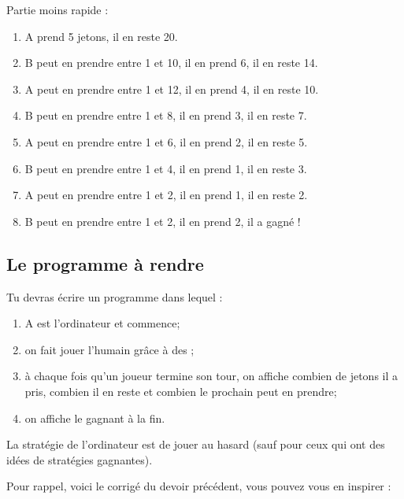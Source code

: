 \documentclass[a4paper,12pt,french]{article}
\begin{document}
Partie moins rapide :
\begin{enumerate}[--]
	\item 	A prend 5 jetons, il en reste 20.
	\item 	B peut en prendre entre 1 et 10, il en prend 6, il en reste 14.
	\item 	A peut en prendre entre 1 et 12, il en prend 4, il en reste 10.
	\item 	B peut en prendre entre 1 et 8, il en prend 3, il en reste 7.
	\item 	A peut en prendre entre 1 et 6, il en prend 2, il en reste 5.
	\item 	B peut en prendre entre 1 et 4, il en prend 1, il en reste 3.
	\item 	A peut en prendre entre 1 et 2, il en prend 1, il en reste 2.
	\item 	B peut en prendre entre 1 et 2, il en prend 2, il a gagné !
\end{enumerate}

\subsection*{Le programme à rendre}

Tu devras écrire un programme dans lequel :
\begin{enumerate}[--]
	\item 	A est l'ordinateur et commence;
	\item 	on fait jouer l'humain grâce à des ;
	\item 	à chaque fois qu'un joueur termine son tour, on affiche combien de jetons il a pris, combien il en reste 
	et combien le prochain peut en prendre;
	\item 	on affiche le gagnant à la fin.\\
\end{enumerate}
La stratégie de l'ordinateur est de jouer au hasard (sauf pour ceux qui ont des idées de stratégies gagnantes).


Pour rappel, voici le corrigé du devoir précédent, vous pouvez vous en inspirer :\\

\inputminted[fontsize=\scriptsize]{python}{prog1.py}
\end{document}
